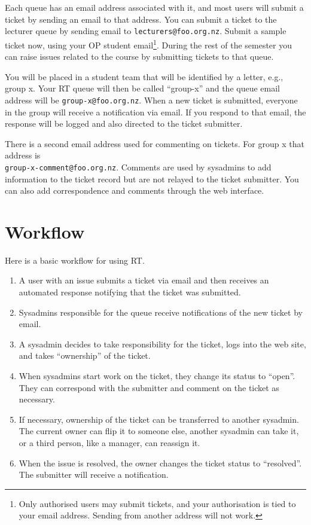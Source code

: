 \documentclass{article}
\begin{document}
Each queue has an email address associated with it, and most users will submit a ticket by sending an email to that address. You can submit a ticket to the lecturer queue by sending email to \texttt{lecturers@foo.org.nz}. Submit a sample ticket now, using your OP student email\footnote{Only authorised users may submit tickets, and your authorisation is tied to your email address. Sending from another address will not work.}. During the rest of the semester you can raise issues related to the course by submitting tickets to that queue.

You will be placed in a student team that will be identified by a letter, e.g., group x. Your RT queue will then be called ``group-x'' and the queue email address will be \texttt{group-x@foo.org.nz}. When a new ticket is submitted, everyone in the group will receive a notification via email. If you respond to that email, the response will be logged and also directed to the ticket submitter.

There is a second email address used for commenting on tickets. For group x that address is \\ \texttt{group-x-comment@foo.org.nz}. Comments are used by sysadmins to add information to the ticket record but are not relayed to the ticket submitter. You can also add correspondence and comments through the web interface.

\section{Workflow}
Here is a basic workflow for using RT.

\begin{enumerate}
  \item A user with an issue submits a ticket via email and then receives an automated response notifying that the ticket was submitted.
  \item Sysadmins responsible for the queue receive notifications of the new ticket by email.
  
  \item A sysadmin decides to take responsibility for the ticket, logs into the web site, and takes ``ownership'' of the ticket.
  \item When sysadmins start work on the ticket, they change its status to ``open''. They can correspond with the submitter and comment on the ticket as necessary.
  \item If necessary, ownership of the ticket can be transferred to another sysadmin. The current owner can flip it to someone else, another sysadmin can take it, or a third person, like a manager, can reassign it.
  \item When the issue is resolved, the owner changes the ticket status to ``resolved''. The submitter will receive a notification.
\end{enumerate}
\end{document}
